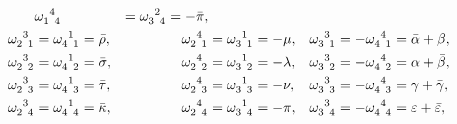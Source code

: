 \begin{xiti}
\begin{jie}
\begin{align*}
			& \tensor{\omega}{_1^4_4} &= \tensor{\omega}{_3^2_4} = - \bar{\pi},
			\\
			\tensor{\omega}{_2^3_1} &= \tensor{\omega}{_4^1_1} = \bar{\rho},
			& \tensor{\omega}{_2^4_1} &= \tensor{\omega}{_3^1_1} = - \mu,
			& \tensor{\omega}{_3^3_1} &= - \tensor{\omega}{_4^4_1} = \bar{\alpha} + \beta,
			\\
			\tensor{\omega}{_2^3_2} &= \tensor{\omega}{_4^1_2} = \bar{\sigma},
			& \tensor{\omega}{_2^4_2} &= \tensor{\omega}{_3^1_2} = - \lambda,
			& \tensor{\omega}{_3^3_2} &= - \tensor{\omega}{_4^4_2} = \alpha + \bar{\beta},
			\\
			\tensor{\omega}{_2^3_3} &= \tensor{\omega}{_4^1_3} = \bar{\tau},
			& \tensor{\omega}{_2^4_3} &= \tensor{\omega}{_3^1_3} = - \nu,
			& \tensor{\omega}{_3^3_3} &= - \tensor{\omega}{_4^4_3} = \gamma + \bar{\gamma},
			\\
			\tensor{\omega}{_2^3_4} &= \tensor{\omega}{_4^1_4} = \bar{\kappa},
			& \tensor{\omega}{_2^4_4} &= \tensor{\omega}{_3^1_4} = - \pi,
			& \tensor{\omega}{_3^3_4} &= - \tensor{\omega}{_4^4_4} = \varepsilon + \bar{\varepsilon},
		\end{align*}

\end{jie}
\end{xiti}

